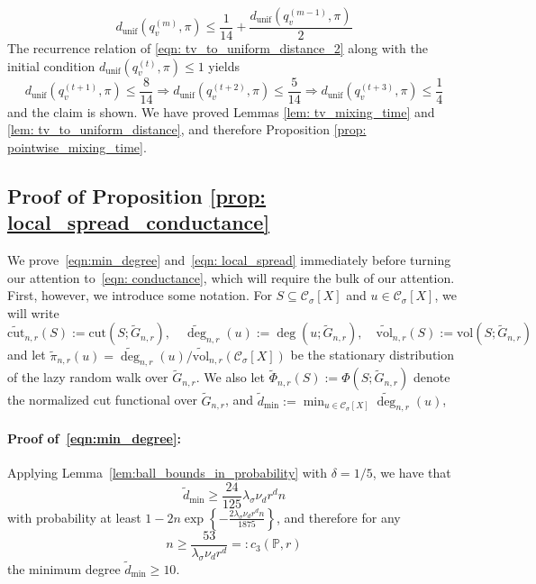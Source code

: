 \documentclass[11pt,twoside]{article}
\newcommand{\set}[1]{\left\{#1\right\}}
\newcommand{\vol}{\mathrm{vol}}
\newcommand{\cut}{\mathrm{cut}}
\newcommand{\1}{\mathbf{1}}
\newcommand{\Xbf}{X}             %
\newcommand{\Pbb}{\mathbb{P}}
\newcommand{\Cset}{\mathcal{C}}
\newcommand{\Csig}{\Cset_{\sigma}}
\newcommand{\degminwt}{\widetilde{d}_{\min}}
\begin{document}
\begin{equation}
d_{\textrm{unif}}(q_v^{(m)}, \pi) \leq \frac{1}{14} + \frac{d_{\textrm{unif}}(q_v^{(m - 1)}, \pi)}{2} \label{eqn: tv_to_uniform_distance_2}
\end{equation}
The recurrence relation of \eqref{eqn: tv_to_uniform_distance_2} along with the initial condition $d_{\textrm{unif}}(q_v^{(t)}, \pi) \leq 1$ yields
\begin{equation*}
d_{\textrm{unif}}(q_v^{(t + 1)}, \pi) \leq \frac{8}{14} \Rightarrow d_{\textrm{unif}}(q_v^{(t + 2)}, \pi) \leq \frac{5}{14} \Rightarrow  d_{\textrm{unif}}(q_v^{(t + 3)}, \pi) \leq \frac{1}{4}
\end{equation*}
and the claim is shown. We have proved Lemmas \ref{lem: tv_mixing_time} and \ref{lem: tv_to_uniform_distance}, and therefore Proposition \ref{prop: pointwise_mixing_time}.

\subsection{Proof of Proposition \ref{prop: local_spread_conductance}}

We prove~\eqref{eqn:min_degree} and~\eqref{eqn: local_spread} immediately before turning our attention to~\eqref{eqn: conductance}, which will require the bulk of our attention. First, however, we introduce some notation. For $S \subseteq \Csig[\Xbf]$ and $u \in \Csig[\Xbf]$, we will write
\begin{equation*}
\widetilde{\cut}_{n,r}(S) := \cut(S; \widetilde{G}_{n,r}), \quad \widetilde{\deg}_{n,r}(u) := \deg(u; \widetilde{G}_{n,r}), \quad 
\widetilde{\vol}_{n,r}(S) := \vol(S; \widetilde{G}_{n,r})
\end{equation*}
and let $\widetilde{\pi}_{n,r}(u) = \widetilde{\deg}_{n,r}(u)/\widetilde{\vol}_{n,r}(\Csig[\Xbf])$ be the stationary distribution of the lazy random walk over $\widetilde{G}_{n,r}$. We also let $\widetilde{\Phi}_{n,r}(S) := \Phi(S; \widetilde{G}_{n,r})$ denote the normalized cut functional over $\widetilde{G}_{n,r}$, and $\degminwt := \min_{u \in \Csig[\Xbf]} \widetilde{\deg}_{n,r}(u)$,

\paragraph{Proof of~\eqref{eqn:min_degree}:}
Applying Lemma~\ref{lem:ball_bounds_in_probability} with $\delta = 1/5$, we have that
\begin{equation*}
\widetilde{d}_{\min} \geq \frac{24}{125} \lambda_{\sigma} \nu_d r^d n
\end{equation*} 
with probability at least $1 - 2n\exp\set{-\frac{2\lambda_{\sigma} \nu_d r^d n}{1875}}$, and therefore for any  
\begin{equation*}
n \geq \frac{53}{\lambda_\sigma \nu_dr^d} =: c_3(\Pbb,r)
\end{equation*}
the minimum degree $\widetilde{d}_{\min} \geq 10$. 
\end{document}

